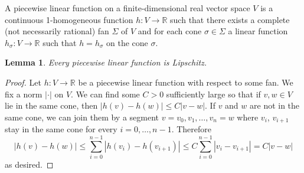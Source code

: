 \documentclass[11pt,a4paper]{article}
\theoremstyle{plain}
\newtheorem{lemma}[theorem]{Lemma}
\theoremstyle{remark}
\theoremstyle{custombold}
\begin{document}
A piecewise linear function on a finite-dimensional real vector space $V$ is a continuous 1-homogeneous function $h\colon V \rightarrow \mathbb R$ such that there exists a complete (not necessarily rational) fan $\Sigma$ of $V$ and for each cone $\sigma \in \Sigma$ a linear function $h_\sigma\colon V\rightarrow\mathbb R$ such that
$h = h_\sigma$ on the cone $\sigma$. 

\begin{lemma}\label{piecewise linear functions are Lipschitz}
   Every piecewise linear function is Lipschitz.
\end{lemma}
\begin{proof}
    Let $h\colon V\rightarrow\mathbb R$ be a piecewise linear function with respect to some fan. We fix a norm $|\cdot|$ on $V$. We can find some $C>0$  sufficiently large so that if $v,w\in V$ lie in the same cone, then $|h(v)-h(w)|\leq C|v-w|$. If $v$ and $w$ are not in the same cone, we can join them by a segment $v=v_0,v_1,\ldots,v_n=w$ where $v_{i}$, $v_{i+1}$  stay in the same cone for every $i=0,\ldots,n-1$. Therefore $$|h(v) - h(w)|\leq \sum_{i=0}^{n-1}|h(v_i)-h(v_{i+1})| \leq C \sum_{i=0}^{n-1} |v_i-v_{i+1}| = C |v-w|$$ as desired.
\end{proof}
\end{document}
